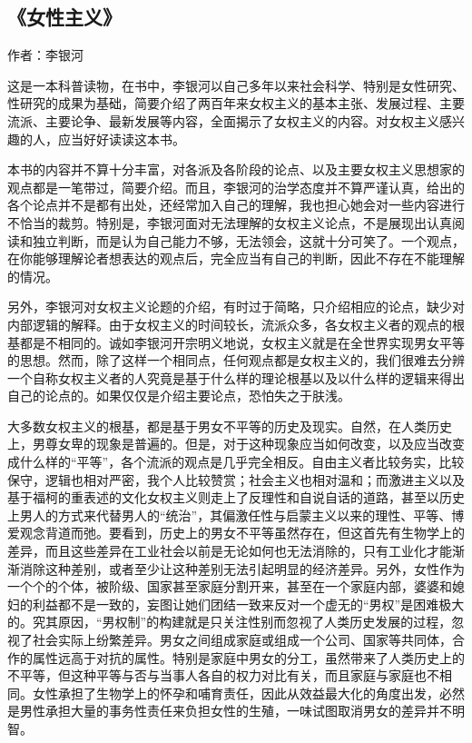 \subsection{《女性主义》}

作者：李银河

这是一本科普读物，在书中，李银河以自己多年以来社会科学、特别是女性研究、性研究的成果为基础，简要介绍了两百年来女权主义的基本主张、发展过程、主要流派、主要论争、最新发展等内容，全面揭示了女权主义的内容。对女权主义感兴趣的人，应当好好读读这本书。

本书的内容并不算十分丰富，对各派及各阶段的论点、以及主要女权主义思想家的观点都是一笔带过，简要介绍。而且，李银河的治学态度并不算严谨认真，给出的各个论点并不是都有出处，还经常加入自己的理解，我也担心她会对一些内容进行不恰当的裁剪。特别是，李银河面对无法理解的女权主义论点，不是展现出认真阅读和独立判断，而是认为自己能力不够，无法领会，这就十分可笑了。一个观点，在你能够理解论者想表达的观点后，完全应当有自己的判断，因此不存在不能理解的情况。

另外，李银河对女权主义论题的介绍，有时过于简略，只介绍相应的论点，缺少对内部逻辑的解释。由于女权主义的时间较长，流派众多，各女权主义者的观点的根基都是不相同的。诚如李银河开宗明义地说，女权主义就是在全世界实现男女平等的思想。然而，除了这样一个相同点，任何观点都是女权主义的，我们很难去分辨一个自称女权主义者的人究竟是基于什么样的理论根基以及以什么样的逻辑来得出自己的论点的。如果仅仅是介绍主要论点，恐怕失之于肤浅。

大多数女权主义的根基，都是基于男女不平等的历史及现实。自然，在人类历史上，男尊女卑的现象是普遍的。但是，对于这种现象应当如何改变，以及应当改变成什么样的“平等”，各个流派的观点是几乎完全相反。自由主义者比较务实，比较保守，逻辑也相对严密，我个人比较赞赏；社会主义也相对温和；而激进主义以及基于福柯的重表述的文化女权主义则走上了反理性和自说自话的道路，甚至以历史上男人的方式来代替男人的“统治”，其偏激任性与启蒙主义以来的理性、平等、博爱观念背道而弛。要看到，历史上的男女不平等虽然存在，但这首先有生物学上的差异，而且这些差异在工业社会以前是无论如何也无法消除的，只有工业化才能渐渐消除这种差别，或者至少让这种差别无法引起明显的经济差异。另外，女性作为一个个的个体，被阶级、国家甚至家庭分割开来，甚至在一个家庭内部，婆婆和媳妇的利益都不是一致的，妄图让她们团结一致来反对一个虚无的“男权”是困难极大的。究其原因，“男权制”的构建就是只关注性别而忽视了人类历史发展的过程，忽视了社会实际上纷繁差异。男女之间组成家庭或组成一个公司、国家等共同体，合作的属性远高于对抗的属性。特别是家庭中男女的分工，虽然带来了人类历史上的不平等，但这种平等与否与当事人各自的权力对比有关，而且家庭与家庭也不相同。女性承担了生物学上的怀孕和哺育责任，因此从效益最大化的角度出发，必然是男性承担大量的事务性责任来负担女性的生殖，一味试图取消男女的差异并不明智。

